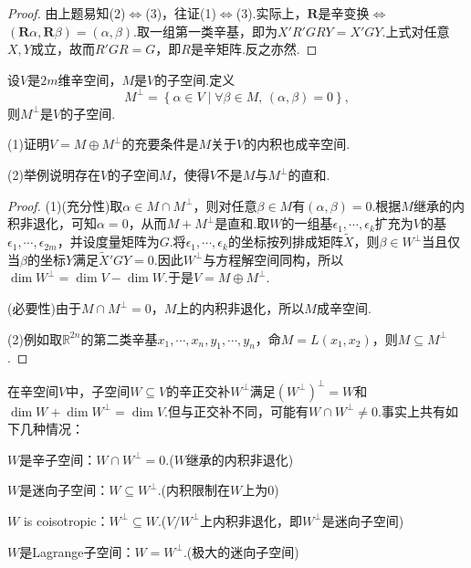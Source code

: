 \begin{proof}
	由上题易知(2)$\Leftrightarrow$(3)，往证(1)$\Leftrightarrow$(3).实际上，$\bm R$是辛变换$\Leftrightarrow$$(\bm R\alpha,\bm R\beta)=(\alpha,\beta)$.取一组第一类辛基，即为$X'R'GRY=X'GY$.上式对任意$X,Y$成立，故而$R'GR=G$，即$R$是辛矩阵.反之亦然.
\end{proof}
\begin{prob}[9]
	设$V$是$2m$维辛空间，$M$是$V$的子空间.定义
	\[
		M^\perp=\left\{\alpha\in V\mid \forall\beta\in M,\,(\alpha,\beta)=0\right\},
	\]
	则$M^\perp$是$V$的子空间.

	(1)证明$V=M\oplus M^\perp$的充要条件是$M$关于$V$的内积也成辛空间.

	(2)举例说明存在$V$的子空间$M$，使得$V$不是$M$与$M^\perp$的直和.
\end{prob}
\begin{proof}
	(1)(充分性)取$\alpha\in M\cap M^\perp$，则对任意$\beta\in M$有$(\alpha,\beta)=0$.根据$M$继承的内积非退化，可知$\alpha=0$，从而$M+M^\perp$是直和.取$W$的一组基$\epsilon_1,\cdots,\epsilon_k$扩充为$V$的基$\epsilon_1,\cdots,\epsilon_{2m}$，并设度量矩阵为$G$.将$\epsilon_1,\cdots,\epsilon_k$的坐标按列排成矩阵$\widetilde{X}$，则$\beta\in W^\perp$当且仅当$\beta$的坐标$Y$满足$\widetilde{X}'GY=0$.因此$W^\perp$与方程解空间同构，所以$\dim W^\perp=\dim V-\dim W$.于是$V=M\oplus M^\perp$.

	(必要性)由于$M\cap M^\perp=0$，$M$上的内积非退化，所以$M$成辛空间.

	(2)例如取$\mathbb{R}^{2n}$的第二类辛基$x_1,\cdots,x_n,y_1,\cdots,y_n$，命$M=L(x_1,x_2)$，则$M\subseteq M^\perp$.
\end{proof}
\begin{note}
	在辛空间$V$中，子空间$W\subseteq V$的辛正交补$W^\perp$满足$(W^\perp)^\perp=W$和$\dim W+\dim W^\perp=\dim V$.但与正交补不同，可能有$W\cap W^\perp\ne0$.事实上共有如下几种情况：
	\begin{mylist}
		\item $W$是辛子空间：$W\cap W^\perp=0$.($W$继承的内积非退化)
		\item $W$是迷向子空间：$W\subseteq W^\perp$.(内积限制在$W$上为$0$)
		\item $W$ is coisotropic：$W^\perp\subseteq W$.($V/W^\perp$上内积非退化，即$W^\perp$是迷向子空间)
		\item $W$是Lagrange子空间：$W=W^\perp$.(极大的迷向子空间)
	\end{mylist}
\end{note}
